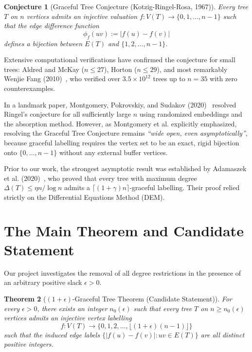 \documentclass[11pt,a4paper]{article}
\newtheorem{theorem}{Theorem}
\newtheorem{conjecture}[theorem]{Conjecture}
\begin{document}
\begin{conjecture}[Graceful Tree Conjecture (Kotzig-Ringel-Rosa, 1967)]\label{conj:graceful}
Every tree $T$ on $n$ vertices admits an injective valuation $f: V(T) \to \{0, 1, \dots, n-1\}$ such that the edge difference function
\[
\phi_f(uv) := |f(u) - f(v)|
\]
defines a bijection between $E(T)$ and $\{1, 2, \dots, n-1\}$.
\end{conjecture}

Extensive computational verifications have confirmed the conjecture for small trees: Aldred and McKay ($n \le 27$), Horton ($n \le 29$), and most remarkably Wenjie Fang (2010)~\cite{fang2010computational}, who verified over $3.5 \times 10^{12}$ trees up to $n=35$ with zero counterexamples.

In a landmark paper, Montgomery, Pokrovskiy, and Sudakov (2020)~\cite{montgomery2020proof} resolved Ringel's conjecture for all sufficiently large $n$ using randomized embeddings and the absorption method. However, as Montgomery et al. explicitly emphasized, resolving the Graceful Tree Conjecture remains \emph{``wide open, even asymptotically''}, because graceful labelling requires the vertex set to be an exact, rigid bijection onto $\{0, \dots, n-1\}$ without any external buffer vertices.

Prior to our work, the strongest asymptotic result was established by Adamaszek et al. (2020)~\cite{adamaszek2020almost}, who proved that every tree with maximum degree $\Delta(T) \le \eta n / \log n$ admits a $\lceil (1+\gamma)n \rceil$-graceful labelling. Their proof relied strictly on the Differential Equations Method (DEM).

\section{The Main Theorem and Candidate Statement}

Our project investigates the removal of all degree restrictions in the presence of an arbitrary positive slack $\epsilon > 0$.

\begin{theorem}[$(1+\epsilon)$-Graceful Tree Theorem (Candidate Statement)]\label{thm:main}
For every $\epsilon > 0$, there exists an integer $n_0(\epsilon)$ such that every tree $T$ on $n \ge n_0(\epsilon)$ vertices admits an injective vertex labelling
\[
f: V(T) \to \{0, 1, 2, \dots, \lfloor (1+\epsilon)(n-1) \rfloor\}
\]
such that the induced edge labels $\{|f(u) - f(v)| : uv \in E(T)\}$ are all distinct positive integers.
\end{theorem}
\end{document}
